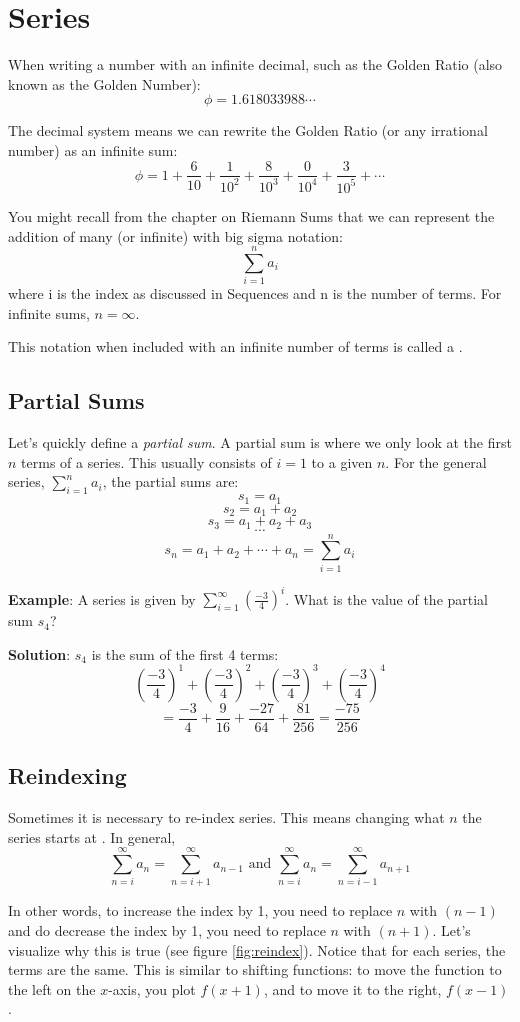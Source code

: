 \chapter{Series}
When writing a number with an infinite decimal, such as the Golden 
Ratio (also known as the Golden Number):
$$\phi = 1.618033988 \cdots$$

The decimal system means we can rewrite the Golden Ratio (or any 
irrational number) as an infinite sum:
$$\phi = 1 + \frac{6}{10} + \frac{1}{10^2} + \frac{8}{10^3} + 
\frac{0}{10^4} + \frac{3}{10^5} + \cdots$$

You might recall from the chapter on Riemann Sums that we can 
represent the addition of many (or infinite) with big sigma notation:
$$\sum_{i = 1}^n a_i$$
where i is the index as discussed in Sequences and n is the number of 
terms. For infinite sums, $n = \infty$.

This notation when included with an infinite number of terms is called a . 

\section{Partial Sums}
Let's quickly define a \textit{partial sum}. A partial sum is where 
we only look at the first $n$ terms of a series. This usually consists of $i=1$ to a given $n$.  For the general 
series, $\sum_{i=1}^{n} a_i$, the partial sums are:
$$s_1 = a_1$$
$$s_2 = a_1 + a_2$$
$$s_3 = a_1 + a_2 + a_3$$
$$\cdots$$
$$s_n = a_1 + a_2 + \cdots + a_n = \sum_{i=1}^{n} a_i$$

\textbf{Example}: A series is given by $\sum_{i=1}^\infty 
(\frac{-3}{4})^i$. What is the value of the partial sum $s_4$?

\textbf{Solution}: $s_4$ is the sum of the first 4 terms: 
$$(\frac{-3}{4})^1 + (\frac{-3}{4})^2 + (\frac{-3}{4})^3 + (\frac{-3}{4})^4$$
$$= \frac{-3}{4} + \frac{9}{16} + \frac{-27}{64} + \frac{81}{256} = 
\frac{-75}{256}$$

\section{Reindexing}
Sometimes it is necessary to re-index series. This means changing what $n$ the 
series starts at . In general,
$$\sum_{n=i}^\infty a_n = \sum_{n=i + 1}^\infty a_{n-1} \text{ and } \sum_{n=i}^
\infty a_n = \sum_{n=i - 1}^\infty a_{n+1}$$

In other words, to increase the index by 1, you need to replace $n$ with $(n-1)$ and 
do decrease the index by 1, you need to replace $n$ with $(n+1)$. Let's 
visualize why this is true (see figure \ref{fig:reindex}). Notice that for 
each series, the terms are the same. This is similar to shifting functions: 
to move the function to the left on the $x$-axis, you plot $f(x + 1)$, and to 
move it to the right, $f(x - 1)$. 

